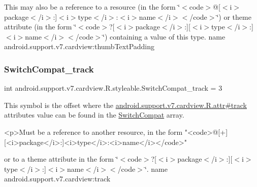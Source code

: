 This may also be a reference to a resource (in the form \char`\"{}$<$code$>$@\mbox{[}$<$i$>$package$<$/i$>$\+:\mbox{]}$<$i$>$type$<$/i$>$\+:$<$i$>$name$<$/i$>$$<$/code$>$\char`\"{}) or theme attribute (in the form \char`\"{}$<$code$>$?\mbox{[}$<$i$>$package$<$/i$>$\+:\mbox{]}\mbox{[}$<$i$>$type$<$/i$>$\+:\mbox{]}$<$i$>$name$<$/i$>$$<$/code$>$\char`\"{}) containing a value of this type.  name android.\+support.\+v7.\+cardview\+:thumb\+Text\+Padding \mbox{\label{classandroid_1_1support_1_1v7_1_1cardview_1_1R_1_1styleable_a0694f9f648cee027249017c5733efdb5}} 
\subsubsection{\texorpdfstring{Switch\+Compat\+\_\+track}{SwitchCompat\_track}}
{\footnotesize\ttfamily int android.\+support.\+v7.\+cardview.\+R.\+styleable.\+Switch\+Compat\+\_\+track = 3\hspace{0.3cm}{\ttfamily [static]}}

This symbol is the offset where the \hyperlink{classandroid_1_1support_1_1v7_1_1cardview_1_1R_1_1attr_a4646bbcc651a7caae0d2a11b80495257}{android.\+support.\+v7.\+cardview.\+R.\+attr\#track} attribute\textquotesingle{}s value can be found in the \hyperlink{classandroid_1_1support_1_1v7_1_1cardview_1_1R_1_1styleable_a8b1fbe9bb91473a7977ff98951ed5255}{Switch\+Compat} array.

\begin{DoxyVerb}      <p>Must be a reference to another resource, in the form "<code>@[+][<i>package</i>:]<i>type</i>:<i>name</i></code>"
\end{DoxyVerb}
 or to a theme attribute in the form \char`\"{}$<$code$>$?\mbox{[}$<$i$>$package$<$/i$>$\+:\mbox{]}\mbox{[}$<$i$>$type$<$/i$>$\+:\mbox{]}$<$i$>$name$<$/i$>$$<$/code$>$\char`\"{}.  name android.\+support.\+v7.\+cardview\+:track \mbox{\label{classandroid_1_1support_1_1v7_1_1cardview_1_1R_1_1styleable_ac405d1f61871d7d972e9ba19778ffd5c}} 
